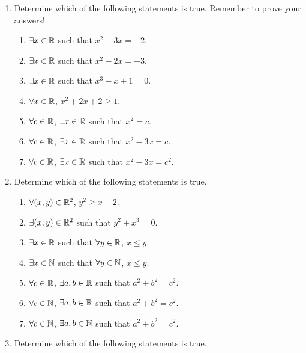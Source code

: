 \probsec{~\ref{sec:open-statements}}
\begin{enumerate}
    \item Determine which of the following statements is true. Remember to prove your answers! 
  \begin{enumerate}
      \item $\exists x \in \mathbb{R}$ such that $x^2 - 3x = -2$.
      \item $\exists x \in \mathbb{R}$ such that $x^2 - 2x = -3$.
      \item $\exists x \in \mathbb{R}$ such that $x^3 - x + 1 = 0$.
      \item $\forall x \in \mathbb{R}$, $x^2 + 2x + 2 \geq 1$.
      \item $\forall c \in \mathbb{R}$, $\exists x \in \mathbb{R}$ such that $x^2 = c$.
      \item $\forall c \in \mathbb{R}$, $\exists x \in \mathbb{R}$ such that $x^2 - 3x = c$.
      \item $\forall c \in \mathbb{R}$, $\exists x \in \mathbb{R}$ such that $x^2 - 3x = c^2$.
  \end{enumerate}
    \item Determine which of the following statements is true.
  \begin{enumerate}
      \item $\forall (x,y) \in \mathbb{R}^2$, $y^2 \geq x - 2$.
      \item $\exists (x,y) \in \mathbb{R}^2$ such that $y^2 + x^3 = 0$.
      \item $\exists x \in \mathbb{R}$ such that $\forall y \in \mathbb{R}$, $x \leq y$.
      \item $\exists x \in \mathbb{N}$ such that $\forall y \in \mathbb{N}$, $x \leq y$.
      \item $\forall c \in \mathbb{R}$, $\exists a, b \in \mathbb{R}$ such that $a^2 + b^2 = c^2$.
      \item $\forall c \in \mathbb{N}$, $\exists a, b \in \mathbb{R}$ such that $a^2 + b^2 = c^2$.
      \item $\forall c \in \mathbb{N}$, $\exists a, b \in \mathbb{N}$ such that $a^2 + b^2 = c^2$.
  \end{enumerate}
    \item Determine which of the following statements is true.

\end{enumerate}
